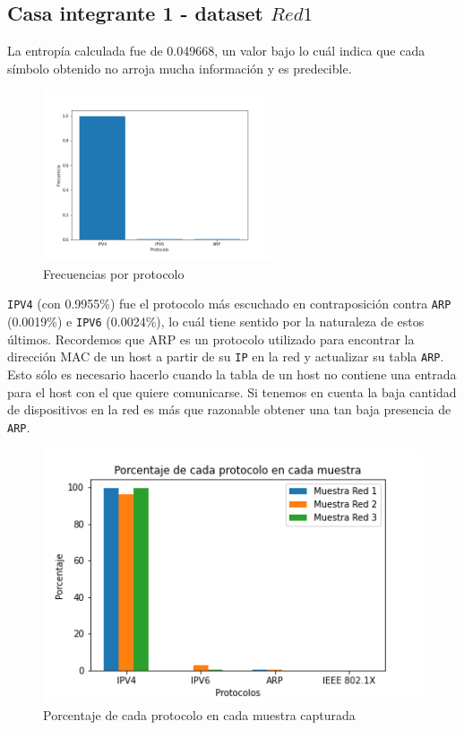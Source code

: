 \subsection{Casa integrante 1 - dataset $Red 1$} 

La entropía calculada fue de 0.049668, un valor bajo lo cuál indica que cada símbolo obtenido no arroja mucha información y es predecible.


\begin{figure}[H]\begin{center}
  \includegraphics[width=0.6\textwidth]{images/freq_ws_4_info.png}\vspace{1em}
  \caption{Frecuencias por protocolo}
\end{center}\end{figure}


\texttt{IPV4} (con 0.9955\%) fue el protocolo más escuchado en contraposición contra \texttt{ARP} (0.0019\%) e \texttt{IPV6} (0.0024\%), lo cuál tiene sentido por la naturaleza de estos últimos. Recordemos que ARP es un protocolo utilizado para encontrar la dirección MAC de un host a partir de su \texttt{IP} en la red y actualizar su tabla \texttt{ARP}. Esto sólo es necesario hacerlo cuando la tabla de un host no contiene una entrada para el host con el que quiere comunicarse. Si tenemos en cuenta la baja cantidad de dispositivos en la red es más que razonable obtener una tan baja presencia de \texttt{ARP}.

\begin{figure}[H]
    \includegraphics[scale=0.6]{images/resultados_generales/porcentaje_cada_protocolo_cada_muestra.png}\vspace{1em}
    \centering
    \caption{Porcentaje de cada protocolo en cada muestra capturada}
    \label{fig: porcentajes}
\end{figure}

